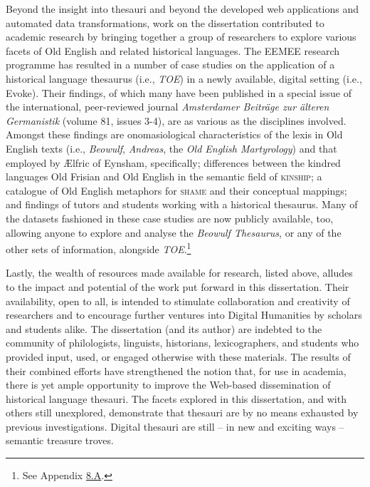 
Beyond the insight into thesauri and beyond the developed web applications and automated data transformations, work on the dissertation contributed to academic research by bringing together a group of researchers to explore various facets of Old English and related historical languages. The EEMEE research programme has resulted in a number of case studies on the application of a historical language thesaurus (i.e., \textit{TOE}) in a newly available, digital setting (i.e., Evoke). Their findings, of which many have been published in a special issue of the international, peer-reviewed journal \textit{Amsterdamer Beiträge zur älteren Germanistik} (volume 81, issues 3-4), are as various as the disciplines involved. Amongst these findings are onomasiological characteristics of the lexis in Old English texts (i.e., \textit{Beowulf}, \textit{Andreas}, the \textit{Old English Martyrology}) and that employed by Ælfric of Eynsham, specifically; differences between the kindred languages Old Frisian and Old English in the semantic field of \textsc{kinship}; a catalogue of Old English metaphors for \textsc{shame} and their conceptual mappings; and findings of tutors and students working with a historical thesaurus. Many of the datasets fashioned in these case studies are now publicly available, too, allowing anyone to explore and analyse the \textit{Beowulf Thesaurus}, or any of the other sets of information, alongside \textit{TOE}.\footnote{See Appendix \hyperref[Appendix8.A]{8.A}.} 

Lastly, the wealth of resources made available for research, listed above, alludes to the impact and potential of the work put forward in this dissertation. Their availability, %
open to all, is intended to stimulate collaboration and creativity of researchers and to encourage further ventures into Digital Humanities by scholars and students alike. The dissertation (and its author) are indebted to the community of philologists, linguists, historians, lexicographers, and students who provided input, used, or engaged otherwise with these materials. 
The results of their combined efforts have strengthened the notion that, for use in academia, there is yet ample opportunity to improve the Web-based dissemination of historical language thesauri. The facets explored in this dissertation, and with others still unexplored, demonstrate that thesauri are by no means exhausted by previous investigations. Digital thesauri are still -- in new and exciting ways -- semantic treasure troves.


